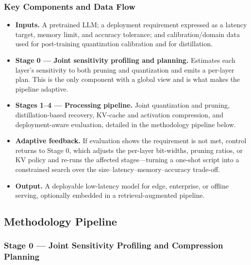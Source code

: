 \documentclass[
11pt, %
english, %
singlespacing, %
headsepline, %
]{MastersDoctoralThesis} %
\begin{document}
\subsubsection{Key Components and Data Flow}

\begin{itemize}

  \item \textbf{Inputs.} A pretrained LLM; a deployment requirement expressed as a latency target, memory limit, and accuracy tolerance; and calibration/domain data used for post-training quantization calibration and for distillation.

  \item \textbf{Stage 0 --- Joint sensitivity profiling and planning.} Estimates each layer's sensitivity to both pruning and quantization and emits a per-layer plan. This is the only component with a global view and is what makes the pipeline adaptive.

  \item \textbf{Stages 1--4 --- Processing pipeline.} Joint quantization and pruning, distillation-based recovery, KV-cache and activation compression, and deployment-aware evaluation, detailed in the methodology pipeline below.

  \item \textbf{Adaptive feedback.} If evaluation shows the requirement is not met, control returns to Stage 0, which adjusts the per-layer bit-widths, pruning ratios, or KV policy and re-runs the affected stages---turning a one-shot script into a constrained search over the size--latency--memory--accuracy trade-off.

  \item \textbf{Output.} A deployable low-latency model for edge, enterprise, or offline serving, optionally embedded in a retrieval-augmented pipeline.

\end{itemize}

\subsection{Methodology Pipeline}

\subsubsection{Stage 0 --- Joint Sensitivity Profiling and Compression Planning}
\end{document}
